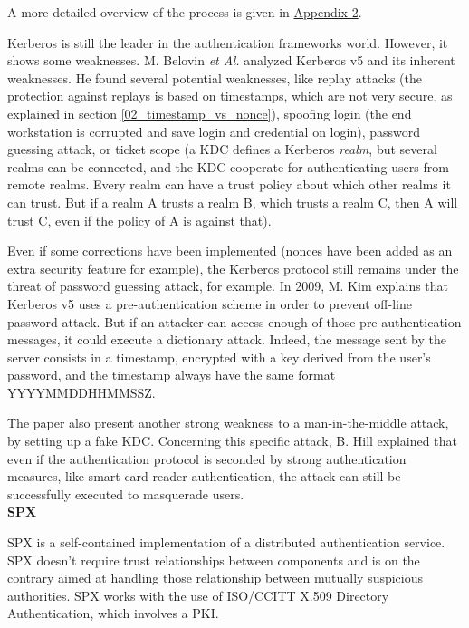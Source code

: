 A more detailed overview of the process is given in \hyperref[appendix:kerberos]{Appendix 2}.

Kerberos is still the leader in the authentication frameworks world. However, it shows some weaknesses. M. Belovin \textit{et Al.} analyzed Kerberos v5\cite{Bellovin1990} and its inherent weaknesses. He found several potential weaknesses, like replay attacks (the protection against replays is based on timestamps, which are not very secure, as explained in section \ref{02_timestamp_vs_nonce}), spoofing login (the end workstation is corrupted and save login and credential on login), password guessing attack, or ticket scope (a KDC defines a Kerberos \textit{realm}, but several realms can be connected, and the KDC cooperate for authenticating users from remote realms. Every realm can have a trust policy about which other realms it can trust. But if a realm A trusts a realm B, which trusts a realm C, then A will trust C, even if the policy of A is against that).

Even if some corrections have been implemented (nonces have been added as an extra security feature for example), the Kerberos protocol still remains under the threat of password guessing attack, for example. In 2009, \cite{kim2009survey} M. Kim explains that Kerberos v5 uses a pre-authentication scheme in order to prevent off-line password attack. But if an attacker can access enough of those pre-authentication messages, it could execute a dictionary attack. Indeed, the message sent by the server consists in a timestamp, encrypted with a key derived from the user's password, and the timestamp always have the same format YYYYMMDDHHMMSSZ.

The paper also present another strong weakness to a man-in-the-middle attack, by setting up a fake KDC. Concerning this specific attack, B. Hill explained that even if the authentication protocol is seconded by strong authentication measures, like smart card reader authentication,  the attack can still be successfully executed to masquerade users\cite{Consultant}.
\\

\quad \tabitem \textbf{SPX}

SPX\cite{Tardo1991} is a self-contained implementation of a distributed authentication service. SPX doesn't require trust relationships between components and is on the contrary aimed at handling those relationship between mutually suspicious authorities. SPX works with the use of ISO/CCITT X.509 Directory Authentication, which involves a PKI.

